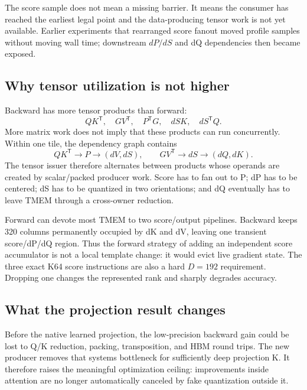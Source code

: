 The score sample does not mean a missing barrier.  It means the consumer has
reached the earliest legal point and the data-producing tensor work is not yet
available.  Earlier experiments that rearranged score fanout moved profile
samples without moving wall time; downstream $dP/dS$ and dQ dependencies then
became exposed.

\subsection{Why tensor utilization is not higher}

Backward has more tensor products than forward:
\begin{equation}
  QK^\mathsf T,\quad GV^\mathsf T,\quad
  P^\mathsf TG,\quad dSK,\quad dS^\mathsf TQ.
  \label{eq:five-bwd-products}
\end{equation}
More matrix work does not imply that these products can run concurrently.
Within one tile, the dependency graph contains
\begin{equation}
  QK^\mathsf T
  \rightarrow P
  \rightarrow (dV,dS),
  \qquad
  GV^\mathsf T
  \rightarrow dS
  \rightarrow (dQ,dK).
  \label{eq:bwd-dependency-dag}
\end{equation}
The tensor issuer therefore alternates between products whose operands are
created by scalar/packed producer work.  Score has to fan out to P; dP has to
be centered; dS has to be quantized in two orientations; and dQ eventually
has to leave TMEM through a cross-owner reduction.

Forward can devote most TMEM to two score/output pipelines.  Backward keeps
320 columns permanently occupied by dK and dV, leaving one transient
score/dP/dQ region.  Thus the forward strategy of adding an independent score
accumulator is not a local template change: it would evict live gradient
state.  The three exact K64 score instructions are also a hard $D=192$
requirement.  Dropping one changes the represented rank and sharply degrades
accuracy.

\subsection{What the projection result changes}

Before the native learned projection, the low-precision backward gain could be
lost to Q/K reduction, packing, transposition, and HBM round trips.  The new
producer removes that systems bottleneck for sufficiently deep projection K.
It therefore raises the meaningful optimization ceiling: improvements inside
attention are no longer automatically canceled by fake quantization outside
it.


